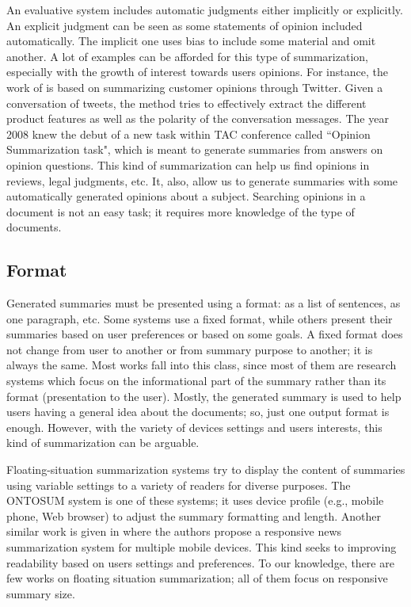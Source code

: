 An evaluative system includes automatic judgments either implicitly or explicitly.
An explicit judgment can be seen as some statements of opinion included automatically.
The implicit one uses bias to include some material and omit another.
A lot of examples can be afforded for this type of summarization, especially with the growth of interest towards users opinions. 
For instance, the work of \citet{16-othman-al} is based on summarizing customer opinions through Twitter. 
Given a conversation of tweets, the method tries to effectively extract the different product features as well as the polarity of the conversation messages.
The year 2008 knew the debut of a new task within TAC conference called ``Opinion Summarization task", which is meant to generate summaries from answers on opinion questions. 
This kind of summarization can help us find opinions in reviews, legal judgments, etc.
It, also, allow us to generate summaries with some automatically generated opinions about a subject. 
Searching opinions in a document is not an easy task; it requires more knowledge of the type of documents. 

\subsection{Format}

Generated summaries must be presented using a format: as a list of sentences, as one paragraph, etc.
Some systems use a fixed format, while others present their summaries based on user preferences or based on some goals.
A fixed format does not change from user to another or from summary purpose to another; it is always the same. 
Most works fall into this class, since most of them are research systems which focus on the informational part of the summary rather than its format (presentation to the user).
Mostly, the generated summary is used to help users having a general idea about the documents; so, just one output format is enough.
However, with the variety of devices settings and users interests, this kind of summarization can be arguable.


Floating-situation summarization systems try to display the content of summaries using variable settings to a variety of readers for diverse purposes. 
The ONTOSUM system \citep{05-bontcheva} is one of these systems; it uses device profile (e.g., mobile phone, Web browser) to adjust the summary formatting and length. 
Another similar work is given in \citep{18-chongtay-al} where the authors propose a responsive news summarization system for multiple mobile devices. 
This kind seeks to improving readability based on users settings and preferences.
To our knowledge, there are few works on floating situation summarization; all of them focus on responsive summary size.  


